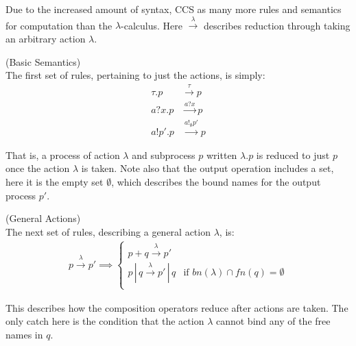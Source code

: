 \documentclass{article}
\begin{document}
        Due to the increased amount of syntax, CCS as many more rules and semantics for computation than the $\lambda$-calculus.
        Here $\xrightarrow{\lambda}$ describes reduction through taking an arbitrary action $\lambda$. \\

        \begin{definition}{(Basic Semantics)\\}
            The first set of rules, pertaining to just the actions, is simply:
            \begin{align}
                \tau.p & \xrightarrow{\tau} p \\
                a?x.p  & \xrightarrow{a? x} p \\
                a!p'.p & \xrightarrow{a!_{\emptyset} p'} p
            \end{align}
        \end{definition}
        That is, a process of action $\lambda$ and subprocess $p$ written $\lambda.p$ is reduced to just $p$ once the action $\lambda$ is taken.
        Note also that the output operation includes a set, here it is the empty set $\emptyset$, which describes the bound names for the output process $p'$. \\


        \begin{definition}{(General Actions)\\}
            The next set of rules, describing a general action $\lambda$, is:
            \begin{align}
                p \xrightarrow{\lambda} p' \implies
                \begin{cases}
                    p + q \xrightarrow{\lambda} p' \\
                    p \, | \, q \xrightarrow{\lambda} p' \, | \, q &\text{if } bn(\lambda) \cap fn(q) = \emptyset \\
                \end{cases}
            \end{align}
        \end{definition}
        This describes how the composition operators reduce after actions are taken.
        The only catch here is the condition that the action $\lambda$ cannot bind any of the free names in $q$. \\
\end{document}
